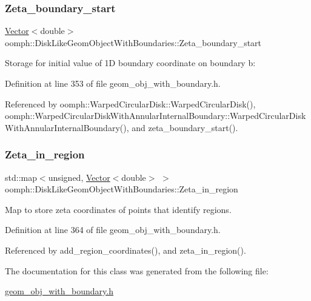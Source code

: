 \subsubsection{\texorpdfstring{Zeta\+\_\+boundary\+\_\+start}{Zeta\_boundary\_start}}
{\footnotesize\ttfamily \hyperlink{classoomph_1_1Vector}{Vector}$<$double$>$ oomph\+::\+Disk\+Like\+Geom\+Object\+With\+Boundaries\+::\+Zeta\+\_\+boundary\+\_\+start\hspace{0.3cm}{\ttfamily [protected]}}



Storage for initial value of 1D boundary coordinate on boundary b\+: 



Definition at line 353 of file geom\+\_\+obj\+\_\+with\+\_\+boundary.\+h.



Referenced by oomph\+::\+Warped\+Circular\+Disk\+::\+Warped\+Circular\+Disk(), oomph\+::\+Warped\+Circular\+Disk\+With\+Annular\+Internal\+Boundary\+::\+Warped\+Circular\+Disk\+With\+Annular\+Internal\+Boundary(), and zeta\+\_\+boundary\+\_\+start().

\mbox{\label{classoomph_1_1DiskLikeGeomObjectWithBoundaries_a915c63839a2156913cfcbcd59a0cd251}} 
\subsubsection{\texorpdfstring{Zeta\+\_\+in\+\_\+region}{Zeta\_in\_region}}
{\footnotesize\ttfamily std\+::map$<$unsigned, \hyperlink{classoomph_1_1Vector}{Vector}$<$double$>$ $>$ oomph\+::\+Disk\+Like\+Geom\+Object\+With\+Boundaries\+::\+Zeta\+\_\+in\+\_\+region\hspace{0.3cm}{\ttfamily [protected]}}



Map to store zeta coordinates of points that identify regions. 



Definition at line 364 of file geom\+\_\+obj\+\_\+with\+\_\+boundary.\+h.



Referenced by add\+\_\+region\+\_\+coordinates(), and zeta\+\_\+in\+\_\+region().



The documentation for this class was generated from the following file\+:\begin{DoxyCompactItemize}
\item 
\hyperlink{geom__obj__with__boundary_8h}{geom\+\_\+obj\+\_\+with\+\_\+boundary.\+h}\end{DoxyCompactItemize}
